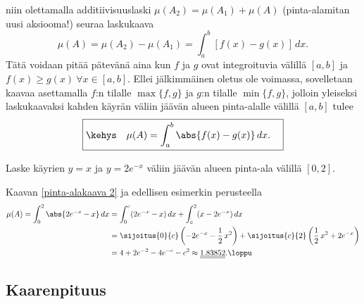 niin olettamalla additiivisuuslaski $\mu(A_2)=\mu(A_1)+\mu(A)$ (pinta-alamitan uusi aksiooma!)
seuraa laskukaava
\[
\mu(A)=\mu(A_2)-\mu(A_1)=\int_a^b [f(x)-g(x)]\,dx.
\]
Tätä voidaan pitää pätevänä aina kun $f$ ja $g$ ovat integroituvia välillä $[a,b]$ ja
$f(x) \ge g(x)\ \forall x\in[a,b]$. Ellei jälkimmäinen oletus ole voimassa, sovelletaan kaavaa 
asettamalla $f$:n tilalle $\max\{f,g\}$ ja $g$:n tilalle $\min\{f,g\}$, jolloin yleiseksi
laskukaavaksi kahden käyrän väliin jäävän alueen pinta-alalle välillä $[a,b]$ tulee
\begin{equation} \label{pinta-alakaava 2}
\boxed{\kehys\quad \mu(A)=\int_a^b \abs{f(x)-g(x)}\,dx. \quad}
\end{equation}
\begin{Exa} Laske käyrien $y=x$ ja $y=2e^{-x}$ väliin jäävän alueen pinta-ala välillä $[0,2]$.
\end{Exa}
\ratk Kaavan \eqref{pinta-alakaava 2} ja edellisen esimerkin perusteella
\begin{align*}
\mu(A) = \int_0^2 \abs{2e^{-x}-x}\,dx &= \int_0^c (2e^{-x}-x)\,dx+\int_c^2(x-2e^{-x})\,dx \\
                                      &= \sijoitus{0}{c}\left(-2e^{-x}-\frac{1}{2}\,x^2\right)
                                       + \sijoitus{c}{2}\left(\frac{1}{2}\,x^2+2e^{-x}\right) \\
                                      &=4+2e^{-2}-4e^{-c}-c^2 
                                       \approx \underline{\underline{1.83852}}. \loppu
\end{align*}                     

\subsection{Kaarenpituus}

